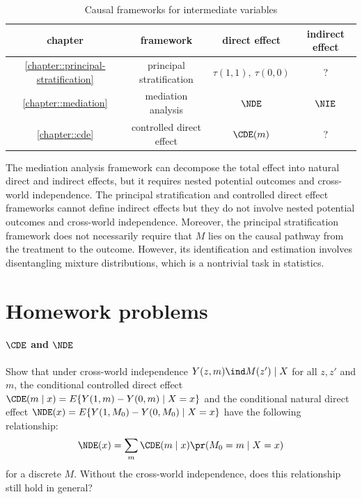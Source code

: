 \begin{table}
\centering 
\caption{Causal frameworks for intermediate variables}\label{table::causal-intermediate-frameworks}
\begin{tabular}{cccc}
\hline 
chapter & framework & direct effect & indirect effect   \\
\hline 
\ref{chapter::principal-stratification} & principal stratification & $\tau(1,1),\ \tau(0,0)$ & ?  \\
\ref{chapter::mediation} & mediation analysis & $\NDE$ & $\NIE$  \\
\ref{chapter::cde}& controlled direct effect & $\CDE(m)$ & ?  \\
\hline 
\end{tabular}
\end{table} 
 
The mediation analysis framework can decompose the total effect into natural direct and indirect effects, but it requires nested potential outcomes and cross-world independence. 
The principal stratification and controlled direct effect frameworks cannot define indirect effects but they do not involve nested potential outcomes and cross-world independence.
Moreover, the principal stratification framework does not necessarily require that $M$ lies on the causal pathway from the treatment to the outcome. However, its identification and estimation involves disentangling mixture distributions, which is a nontrivial task in statistics. 



  
  \section{Homework problems}

\paragraph{$\CDE$ and $\NDE$}\label{problem::cde-nde}

Show that under cross-world independence 
$
Y(z,m) \ind M(z') \mid X
$
for all $z,z'$ and $m$,  the conditional controlled direct effect $\CDE(m\mid x) = E\{  Y(1,m)  - Y(0,m)\mid X=x\}$ and the conditional natural direct effect $\NDE(x) = E\{   Y(1,M_0) - Y(0, M_0) \mid X=x  \}$ have the following relationship:
$$
\NDE(x) = \sum_m \CDE(m\mid x) \pr(M_0 = m\mid X=x)
$$
for a discrete $M$. Without the cross-world independence, does this relationship still hold in general? 
  
  
  
